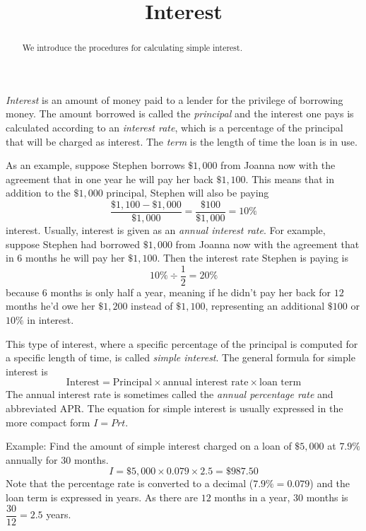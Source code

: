 \documentclass{ximera}
\title{Interest}
\begin{document}
\begin{abstract}
We introduce the procedures for calculating simple interest.
\end{abstract}
\maketitle


\emph{Interest} is an amount of money paid to a lender for the privilege of borrowing money. The amount borrowed is called the \emph{principal} and the interest one pays is calculated according to an \emph{interest rate}, which is a percentage of the principal that will be charged as interest. The \emph{term} is the length of time the loan is in use.

As an example, suppose Stephen borrows $\$1,000$ from Joanna now with the agreement that in one year he will pay her back $\$1,100$. This means that in addition to the $\$1,000$ principal, Stephen will also be paying
\[
\frac{\$1,100-\$1,000}{\$1,000}=\frac{\$100}{\$1,000}=10\%
\]
interest. Usually, interest is given as an \emph{annual interest rate}. For example, suppose Stephen had borrowed $\$1,000$ from Joanna now with the agreement that in $6$ months he will pay her $\$1,100$. Then the interest rate Stephen is paying is
\[
10\%\div \frac{1}{2}=20\%
\]
because $6$ months is only half a year, meaning if he didn't pay her back for $12$ months he'd owe her $\$1,200$ instead of $\$1,100$, representing an additional $\$100$ or $10\%$ in interest.

This type of interest, where a specific percentage of the principal is computed for a specific length of time, is called \emph{simple interest}. The general formula for simple interest is
\begin{equation}\label{simpleinterest}
\text{Interest}=\text{Principal}\times\text{annual interest rate}\times\text{loan term}
\end{equation}
The annual interest rate is sometimes called the \emph{annual percentage rate} and abbreviated APR. The equation for simple interest is usually expressed in the more compact form $I=Prt$.

Example: Find the amount of simple interest charged on a loan of $\$5,000$ at $7.9\%$ annually for $30$ months.
$$
I=\$5,000\times 0.079\times 2.5=\$987.50
$$
Note that the percentage rate is converted to a decimal ($7.9\%=0.079$) and the loan term is expressed in years. As there are $12$ months in a year, $30$ months is $\dfrac{30}{12}=2.5$ years.
\end{document}
